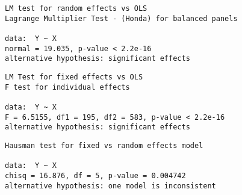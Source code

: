 \documentclass{article}
\begin{document}
\newpage
\begin{verbatim}
LM test for random effects vs OLS
Lagrange Multiplier Test - (Honda) for balanced panels

data:  Y ~ X
normal = 19.035, p-value < 2.2e-16
alternative hypothesis: significant effects

\end{verbatim}

\begin{verbatim}
LM Test for fixed effects vs OLS
F test for individual effects

data:  Y ~ X
F = 6.5155, df1 = 195, df2 = 583, p-value < 2.2e-16
alternative hypothesis: significant effects
\end{verbatim}

\begin{verbatim}
Hausman test for fixed vs random effects model

data:  Y ~ X
chisq = 16.876, df = 5, p-value = 0.004742
alternative hypothesis: one model is inconsistent
\end{verbatim}
\end{document}
